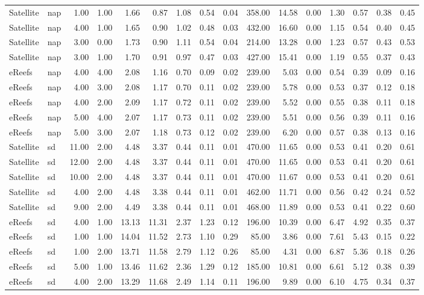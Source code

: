 \begin{table}[ht]
\begin{tabular}{llrrrrrrrrrrrrrr}
  Satellite & nap & 1.00 & 1.00 & 1.66 & 0.87 & 1.08 & 0.54 & 0.04 & 358.00 & 14.58 & 0.00 & 1.30 & 0.57 & 0.38 & 0.45 \\ 
  Satellite & nap & 4.00 & 1.00 & 1.65 & 0.90 & 1.02 & 0.48 & 0.03 & 432.00 & 16.60 & 0.00 & 1.15 & 0.54 & 0.40 & 0.45 \\ 
  Satellite & nap & 3.00 & 0.00 & 1.73 & 0.90 & 1.11 & 0.54 & 0.04 & 214.00 & 13.28 & 0.00 & 1.23 & 0.57 & 0.43 & 0.53 \\ 
  Satellite & nap & 3.00 & 1.00 & 1.70 & 0.91 & 0.97 & 0.47 & 0.03 & 427.00 & 15.41 & 0.00 & 1.19 & 0.55 & 0.37 & 0.43 \\ 
  eReefs & nap & 4.00 & 4.00 & 2.08 & 1.16 & 0.70 & 0.09 & 0.02 & 239.00 & 5.03 & 0.00 & 0.54 & 0.39 & 0.09 & 0.16 \\ 
  eReefs & nap & 4.00 & 3.00 & 2.08 & 1.17 & 0.70 & 0.11 & 0.02 & 239.00 & 5.78 & 0.00 & 0.53 & 0.37 & 0.12 & 0.18 \\ 
  eReefs & nap & 4.00 & 2.00 & 2.09 & 1.17 & 0.72 & 0.11 & 0.02 & 239.00 & 5.52 & 0.00 & 0.55 & 0.38 & 0.11 & 0.18 \\ 
  eReefs & nap & 5.00 & 4.00 & 2.07 & 1.17 & 0.73 & 0.11 & 0.02 & 239.00 & 5.51 & 0.00 & 0.56 & 0.39 & 0.11 & 0.16 \\ 
  eReefs & nap & 5.00 & 3.00 & 2.07 & 1.18 & 0.73 & 0.12 & 0.02 & 239.00 & 6.20 & 0.00 & 0.57 & 0.38 & 0.13 & 0.16 \\ 
   \midrule
Satellite & sd & 11.00 & 2.00 & 4.48 & 3.37 & 0.44 & 0.11 & 0.01 & 470.00 & 11.65 & 0.00 & 0.53 & 0.41 & 0.20 & 0.61 \\ 
  Satellite & sd & 12.00 & 2.00 & 4.48 & 3.37 & 0.44 & 0.11 & 0.01 & 470.00 & 11.65 & 0.00 & 0.53 & 0.41 & 0.20 & 0.61 \\ 
  Satellite & sd & 10.00 & 2.00 & 4.48 & 3.37 & 0.44 & 0.11 & 0.01 & 470.00 & 11.67 & 0.00 & 0.53 & 0.41 & 0.20 & 0.61 \\ 
  Satellite & sd & 4.00 & 2.00 & 4.48 & 3.38 & 0.44 & 0.11 & 0.01 & 462.00 & 11.71 & 0.00 & 0.56 & 0.42 & 0.24 & 0.52 \\ 
  Satellite & sd & 9.00 & 2.00 & 4.49 & 3.38 & 0.44 & 0.11 & 0.01 & 468.00 & 11.89 & 0.00 & 0.53 & 0.41 & 0.22 & 0.60 \\ 
  eReefs & sd & 4.00 & 1.00 & 13.13 & 11.31 & 2.37 & 1.23 & 0.12 & 196.00 & 10.39 & 0.00 & 6.47 & 4.92 & 0.35 & 0.37 \\ 
  eReefs & sd & 1.00 & 1.00 & 14.04 & 11.52 & 2.73 & 1.10 & 0.29 & 85.00 & 3.86 & 0.00 & 7.61 & 5.43 & 0.15 & 0.22 \\ 
  eReefs & sd & 1.00 & 2.00 & 13.71 & 11.58 & 2.79 & 1.12 & 0.26 & 85.00 & 4.31 & 0.00 & 6.87 & 5.36 & 0.18 & 0.26 \\ 
  eReefs & sd & 5.00 & 1.00 & 13.46 & 11.62 & 2.36 & 1.29 & 0.12 & 185.00 & 10.81 & 0.00 & 6.61 & 5.12 & 0.38 & 0.39 \\ 
  eReefs & sd & 4.00 & 2.00 & 13.29 & 11.68 & 2.49 & 1.14 & 0.11 & 196.00 & 9.89 & 0.00 & 6.10 & 4.75 & 0.34 & 0.37 \\ 
  \end{tabular}
\endgroup
\end{table}
